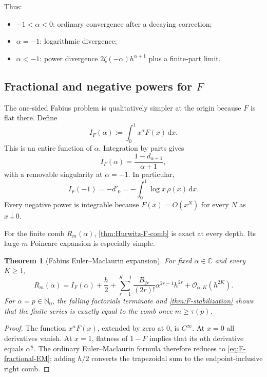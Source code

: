 \documentclass[11pt]{article}
\newtheorem{theorem}{Theorem}[section]
\theoremstyle{definition}
\newcommand{\dd}{\,\mathrm{d}}
\newcommand{\N}{\mathbb{N}}
\newcommand{\C}{\mathbb{C}}
\newcommand{\fall}[2]{#1^{\underline{#2}}}
\newcommand{\bigO}{\mathcal{O}}
\begin{document}
Thus:
\begin{itemize}[leftmargin=2em]
\item $-1<\alpha<0$: ordinary convergence after a decaying correction;
\item $\alpha=-1$: logarithmic divergence;
\item $\alpha<-1$: power divergence
$2\zeta(-\alpha)h^{\alpha+1}$ plus a finite-part limit.
\end{itemize}

\subsection{Fractional and negative powers for \texorpdfstring{$F$}{F}}
\label{sec:F-fractional}

The one-sided Fabius problem is qualitatively simpler at the origin because
$F$ is flat there.  Define
\begin{equation}
 I_F(\alpha):=\int_0^1x^\alpha F(x)\dd x.
 \label{eq:IF-alpha}
\end{equation}
This is an entire function of $\alpha$.  Integration by parts gives
\begin{equation}
 I_F(\alpha)=\frac{1-d_{\alpha+1}}{\alpha+1},
 \label{eq:IF-d-alpha}
\end{equation}
with a removable singularity at $\alpha=-1$.  In particular,
\begin{equation}
 I_F(-1)=-d'_0=-\int_0^1\log x\,\rho(x)\dd x.
 \label{eq:IF-minus-one}
\end{equation}
Every negative power is integrable because $F(x)=O(x^N)$ for every $N$ as
$x\downarrow0$.

For the finite comb $R_m(\alpha)$, \cref{thm:Hurwitz-F-comb} is exact at every
depth.  Its large-$m$ Poincare expansion is especially simple.

\begin{theorem}[Fabius Euler--Maclaurin expansion]
\label{thm:F-fractional-EM}
For fixed $\alpha\in\C$ and every $K\ge1$,
\begin{equation}
 R_m(\alpha)
 =I_F(\alpha)+\frac h2
 +\sum_{r=1}^{K-1}\frac{B_{2r}}{(2r)!}
 \fall\alpha{2r-1}h^{2r}
 +\bigO_{\alpha,K}(h^{2K}).
 \label{eq:F-fractional-EM}
\end{equation}
For $\alpha=p\in\N_0$, the falling factorials terminate and
\cref{thm:F-stabilization} shows that the finite series is exactly equal to
the comb once $m\ge\tau(p)$.
\end{theorem}

\begin{proof}
The function $x^\alpha F(x)$, extended by zero at $0$, is $C^\infty$.  At
$x=0$ all derivatives vanish.  At $x=1$, flatness of $1-F$ implies that its
$n$th derivative equals $\fall\alpha n$.  The ordinary Euler--Maclaurin
formula therefore reduces to \eqref{eq:F-fractional-EM}; adding $h/2$ converts
the trapezoidal sum to the endpoint-inclusive right comb.
\end{proof}
\end{document}
